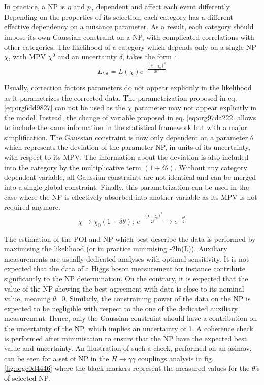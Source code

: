 In practice, a NP is $\eta$ and $p_T$ dependent and affect each event differently.
Depending on the properties of its selection, each category has a different effective dependency on a nuisance parameter.
As a result, each category should impose its own Gaussian constraint on a NP, with complicated correlations with other categories.
The likelihood of a category which depends only on a single NP \(\chi\), with MPV \(\chi^{\text{0}}\) and an uncertainty \(\delta\),  takes the form :
\begin{equation}
\label{eq:org6dd9827}
L_{tot} = L(\chi)e^{-\frac{(\chi-\chi_0)^2}{2\delta^2}}
\end{equation}


Usually, correction factors parameters do not appear explicitly in the likelihood as it parametrizes the corrected data.
The parametrization proposed in eq. \ref{eq:org6dd9827} can not be used as the \(\chi\) parameter may not appear explicitly in the model.
Instead, the change of variable proposed in eq. \ref{eq:org97da222}  allows to include the same information in the statistical framework but with a major simplification.
The Gaussian constraint is now only dependent on a parameter \(\theta\) which represents the deviation of the parameter NP, in units of its uncertainty, with respect to its MPV.
The information about the deviation is also included into the category by the multiplicative term $(1+\delta \theta)$.
Without any category dependent variable, all Gaussian constraints are not identical and can be merged into a single global constraint.
Finally, this parametrization can be used in the case where the NP is effectively absorbed into another variable as its MPV is not required anymore.
\begin{equation}
\label{eq:org97da222}
\chi \rightarrow \chi_0 (1+\delta\theta); \ e^{-\frac{(\chi-\chi_0)^2}{2\delta^2}} \rightarrow e^{-\frac{\theta^2}{2}}
\end{equation}


The estimation of the POI and NP which best describe the data is performed by maximising the likelihood (or in practice minimising -2ln(L)).
Auxiliary measurements are usually dedicated analyses with optimal sensitivity.
It is not expected that the data of a Higgs boson measurement for instance contribute significantly to the NP determination.
On the contrary, it is expected that the value of the NP showing the best agreement with data is close to its nominal value, meaning \(\theta\)=0.
Similarly, the constraining power of the data on the NP is expected to be negligible with respect to the one of the dedicated auxiliary measurement.
Hence, only the Gaussian constraint should have a contribution on the uncertainty of the NP, which implies an uncertainty of 1.
A coherence check is performed after minimisation to ensure that the NP have the expected best value and uncertainty.
An illustration of such a check, performed on an asimov, can be seen for a set of NP in the $H\rightarrow\gamma\gamma$ couplings analysis in fig. \ref{fig:orgc0d4446} where the black markers represent the measured values for the \(\theta\)'s of selected NP.


